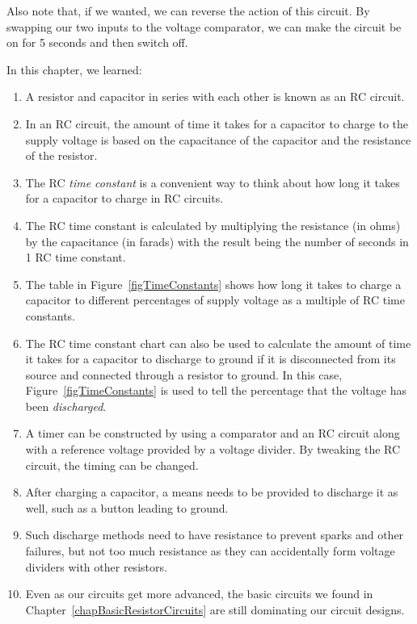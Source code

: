 Also note that, if we wanted, we can reverse the action of this circuit.  
By swapping our two inputs to the voltage comparator, we can make the circuit be on for 5 seconds and then switch off.

\reviewsection

In this chapter, we learned:

\begin{enumerate}
\item A resistor and capacitor in series with each other is known as an RC circuit.
\item In an RC circuit, the amount of time it takes for a capacitor to charge to the supply voltage is based on the capacitance of the capacitor and the resistance of the resistor.
\item The RC \emph{time constant} is a convenient way to think about how long it takes for a capacitor to charge in RC circuits.
\item The RC time constant is calculated by multiplying the resistance (in ohms) by the capacitance (in farads) with the result being the number of seconds in 1 RC time constant.
\item The table in Figure~\ref{figTimeConstants} shows how long it takes to charge a capacitor to different percentages of supply voltage as a multiple of RC time constants.
\item The RC time constant chart can also be used to calculate the amount of time it takes for a capacitor to discharge to ground if it is disconnected from its source and connected through a resistor to ground.  In this case, Figure~\ref{figTimeConstants} is used to tell the percentage that the voltage has been \emph{discharged}.
\item A timer can be constructed by using a comparator and an RC circuit along with a reference voltage provided by a voltage divider.  By tweaking the RC circuit, the timing can be changed.
\item After charging a capacitor, a means needs to be provided to discharge it as well, such as a button leading to ground.
\item Such discharge methods need to have resistance to prevent sparks and other failures, but not too much resistance as they can accidentally form voltage dividers with other resistors.
\item Even as our circuits get more advanced, the basic circuits we found in Chapter~\ref{chapBasicResistorCircuits} are still dominating our circuit designs.
\end{enumerate}

